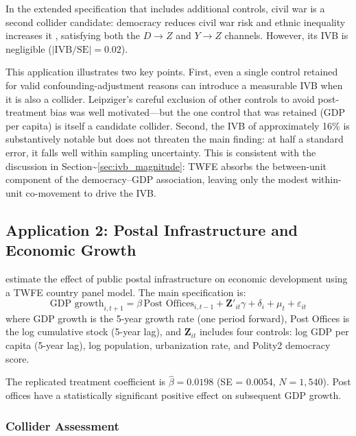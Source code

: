 \documentclass[
]{article}
\begin{document}
In the extended specification that includes additional controls, civil
war is a second collider candidate: democracy reduces civil war risk
\citep{cederman_etal2013} and ethnic inequality increases it
\citep{cederman_etal2013}, satisfying both the \(D \to Z\) and
\(Y \to Z\) channels. However, its IVB is negligible
(\(|\text{IVB}/\text{SE}| = 0.02\)).

This application illustrates two key points. First, even a single
control retained for valid confounding-adjustment reasons can introduce
a measurable IVB when it is also a collider. Leipziger's careful
exclusion of other controls to avoid post-treatment bias was well
motivated---but the one control that was retained (GDP per capita) is
itself a candidate collider. Second, the IVB of approximately 16\% is
substantively notable but does not threaten the main finding: at half a
standard error, it falls well within sampling uncertainty. This is
consistent with the discussion in
Section\textasciitilde{}\ref{sec:ivb_magnitude}: TWFE absorbs the
between-unit component of the democracy--GDP association, leaving only
the modest within-unit co-movement to drive the IVB.

\subsection{\texorpdfstring{Application 2: Postal Infrastructure and
Economic Growth
\label{sec:app_rogowski}}{Application 2: Postal Infrastructure and Economic Growth }}\label{application-2-postal-infrastructure-and-economic-growth}

\citet{rogowski_etal2022} estimate the effect of public postal
infrastructure on economic development using a TWFE country panel model.
The main specification is: \[
\text{GDP growth}_{i,t+1} = \beta \, \text{Post Offices}_{i,t-1} + \mathbf{Z}'_{it}\gamma + \delta_i + \mu_t + \varepsilon_{it}
\] where GDP growth is the 5-year growth rate (one period forward), Post
Offices is the log cumulative stock (5-year lag), and
\(\mathbf{Z}_{it}\) includes four controls: log GDP per capita (5-year
lag), log population, urbanization rate, and Polity2 democracy score.

The replicated treatment coefficient is \(\hat\beta = 0.0198\) (SE =
0.0054, \(N = 1,540\)). Post offices have a statistically significant
positive effect on subsequent GDP growth.

\subsubsection{Collider Assessment}\label{collider-assessment-1}
\end{document}
